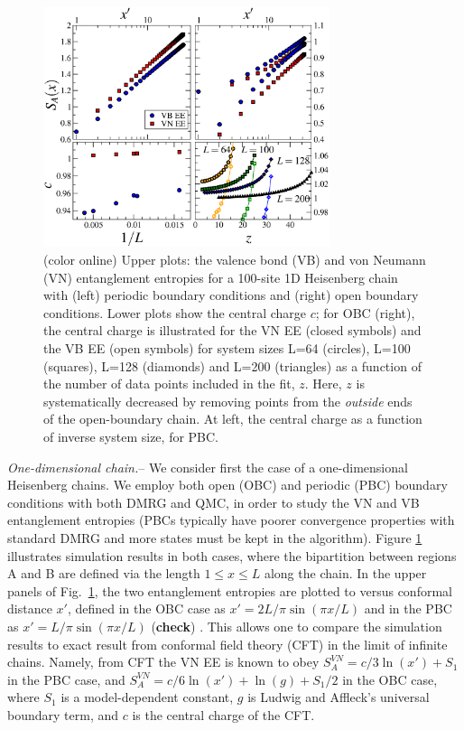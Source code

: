 \documentclass[prl,aps,twocolumn,floatfix,amsmath,amssymb,superscriptaddress,tightenlines]{revtex4}
\begin{document}
\begin{figure}
{
\includegraphics[width=3.3in]{4-panelFIG1.eps}
\caption{(color online) Upper plots: the valence bond (VB) and von Neumann (VN) entanglement entropies for a 100-site 1D Heisenberg chain with (left) periodic boundary conditions and (right) open boundary conditions.  Lower plots show the central charge $c$; for OBC (right), the central charge is illustrated for the VN EE (closed symbols) and the VB EE (open symbols) for system sizes L=64 (circles), L=100 (squares), L=128 (diamonds) and L=200 (triangles) as a function of the number of data points included in the fit, $z$.  Here, $z$ is systematically decreased by removing points from the {\it outside} ends of the open-boundary chain.  At left, the central charge as a function of inverse system size, for PBC.
\label{1D}}}
\end{figure}

{\it One-dimensional chain.}-- We consider first the case of a one-dimensional Heisenberg chains.  We employ both open (OBC) and periodic (PBC) boundary conditions with both DMRG and QMC, in order to study the VN and VB entanglement entropies (PBCs typically have poorer convergence properties with standard DMRG and more states must be kept in the algorithm).  Figure \ref{1D} illustrates simulation results in both cases, where the bipartition between regions A and B are defined via the length $1 \leq x \leq L$ along the chain.  In the upper panels of Fig.~\ref{1D}, the two entanglement entropies are plotted to versus conformal distance $x'$, defined in the OBC case as $x'=2L/\pi \sin(\pi x / L)$ and in the PBC as $x'=L/\pi \sin(\pi x / L)$ ({\bf check}) \cite{Cardy}.  This allows one to compare the simulation results to exact result from conformal field theory (CFT) in the limit of infinite chains.  Namely, from CFT the VN EE is known to obey $S^{VN}_A = c/3 \ln(x') + S_1$ in the PBC case, and $S^{VN}_A = c/6 \ln(x') + \ln(g)+S_1/2$ in the OBC case, where $S_1$ is a model-dependent constant, $g$ is Ludwig and Affleck's universal boundary term, and $c$ is the central charge of the CFT.
\end{document}
